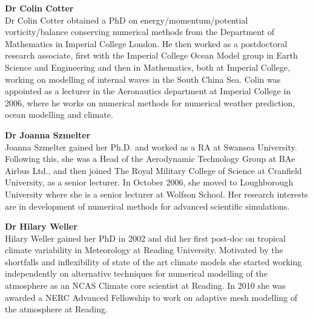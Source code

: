 {\bf Dr Colin Cotter} \\
Dr Colin Cotter obtained a PhD on energy/momentum/potential vorticity/balance conserving numerical methods from the Department of Mathematics in Imperial College London. He then worked as a postdoctoral research associate, first with the Imperial College Ocean Model group in Earth Science and Engineering and then in Mathematics, both at Imperial College, working on modelling of internal waves in the South China Sea. Colin was appointed as a lecturer in the Aeronautics department at Imperial College in 2006, where he works on numerical methods for numerical weather prediction, ocean modelling and climate.

{\bf Dr Joanna Szmelter} \\
Joanna Szmelter gained her Ph.D. and worked as a RA at Swansea University. Following this, she was a Head of the Aerodynamic Technology Group at BAe Airbus Ltd., and then joined The Royal Military College of Science at Cranfield University, as a senior lecturer. In October 2006, she moved to Loughborough University where she is a senior lecturer at Wolfson School. Her research interests are in development of numerical methods for advanced scientific simulations.

{\bf Dr Hilary Weller} \\
Hilary Weller gained her PhD in 2002 and did her first post-doc on tropical climate variability in Meteorology at Reading University. Motivated by the shortfalls and inflexibility of state of the art climate models she started working independently on alternative techniques for numerical modelling of the atmosphere as an NCAS Climate core scientist at Reading. In 2010 she was awarded a NERC Advanced Fellowship to work on adaptive mesh modelling of the atmosphere at Reading. 


